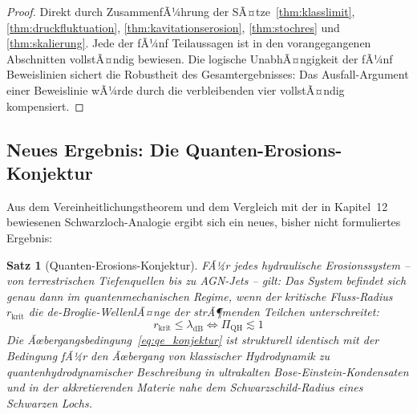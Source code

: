 ﻿\documentclass[12pt,a4paper]{report}
\newtheorem{theorem}{Satz}[chapter]
\begin{document}
\begin{proof}
	Direkt durch ZusammenfÃ¼hrung der SÃ¤tze~\ref{thm:klasslimit}, \ref{thm:druckfluktuation}, \ref{thm:kavitationserosion}, \ref{thm:stochres} und \ref{thm:skalierung}. Jede der fÃ¼nf Teilaussagen ist in den vorangegangenen Abschnitten vollstÃ¤ndig bewiesen. Die logische UnabhÃ¤ngigkeit der fÃ¼nf Beweislinien sichert die Robustheit des Gesamtergebnisses: Das Ausfall-Argument einer Beweislinie wÃ¼rde durch die verbleibenden vier vollstÃ¤ndig kompensiert.
\end{proof}

\subsection{Neues Ergebnis: Die Quanten-Erosions-Konjektur}

Aus dem Vereinheitlichungstheorem und dem Vergleich mit der in Kapitel~12 bewiesenen Schwarzloch-Analogie ergibt sich ein neues, bisher nicht formuliertes Ergebnis:

\begin{theorem}[Quanten-Erosions-Konjektur]
	\label{thm:qe_konjektur}
	FÃ¼r jedes hydraulische Erosionssystem -- von terrestrischen Tiefenquellen bis zu AGN-Jets -- gilt: Das System befindet sich genau dann im quantenmechanischen Regime, wenn der kritische Fluss-Radius $r_\mathrm{krit}$ die de-Broglie-WellenlÃ¤nge der strÃ¶menden Teilchen unterschreitet:
	\begin{equation}
		r_\mathrm{krit} \leq \lambda_\mathrm{dB} \iff \Pi_\mathrm{QH} \lesssim 1
		\label{eq:qe_konjektur}
	\end{equation}
	Die Ãœbergangsbedingung~\eqref{eq:qe_konjektur} ist strukturell identisch mit der Bedingung fÃ¼r den Ãœbergang von klassischer Hydrodynamik zu quantenhydrodynamischer Beschreibung in ultrakalten Bose-Einstein-Kondensaten und in der akkretierenden Materie nahe dem Schwarzschild-Radius eines Schwarzen Lochs.
\end{theorem}
\end{document}
